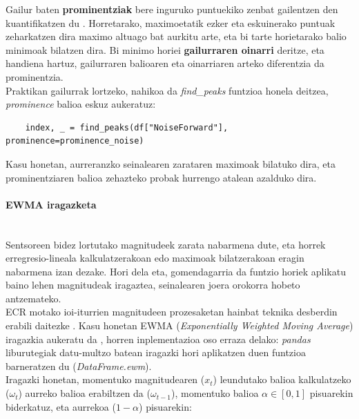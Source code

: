 \documentclass[12pt]{article}
\numberwithin{figure}{section}
\numberwithin{equation}{section}
\begin{document}
Gailur baten \textbf{prominentziak} bere inguruko puntuekiko zenbat gailentzen den kuantifikatzen du \cite{scipy_scipysignal_2025}. Horretarako, maximoetatik ezker eta eskuinerako puntuak zeharkatzen dira maximo altuago bat aurkitu arte, eta bi tarte horietarako balio minimoak bilatzen dira. Bi minimo horiei \textbf{gailurraren oinarri} deritze, eta handiena hartuz, gailurraren balioaren eta oinarriaren arteko diferentzia da prominentzia.\\

Praktikan gailurrak lortzeko, nahikoa da \textit{find\_peaks} funtzioa honela deitzea, \textit{prominence} balioa eskuz aukeratuz:

\begin{verbatim}
    index, _ = find_peaks(df["NoiseForward"], prominence=prominence_noise)
\end{verbatim}

Kasu honetan, aurreranzko seinalearen zarataren maximoak bilatuko dira, eta prominentziaren balioa zehazteko probak hurrengo atalean azalduko dira.

\paragraph{EWMA iragazketa} \leavevmode\\

Sentsoreen bidez lortutako magnitudeek zarata nabarmena dute, eta  horrek erregresio-lineala kalkulatzerakoan edo maximoak bilatzerakoan eragin nabarmena izan dezake. Hori dela eta, gomendagarria da funtzio horiek aplikatu baino lehen magnitudeak iragaztea, seinalearen joera orokorra hobeto antzemateko.\\

ECR motako ioi-iturrien magnitudeen prozesaketan hainbat teknika desberdin erabili daitezke \cite{wang_ion_2024} \cite{rajagopalan_generalized_2003}. Kasu honetan EWMA (\textit{Exponentially Weighted Moving Average}) iragazkia aukeratu da \cite{ross_chapter_2021}, horren inplementazioa oso erraza delako: \textit{pandas} liburutegiak datu-multzo batean iragazki hori aplikatzen duen funtzioa barneratzen du (\textit{DataFrame.ewm}).\\

Iragazki honetan, momentuko magnitudearen ($x_t$) leundutako balioa kalkulatzeko ($\omega_t$) aurreko balioa erabiltzen da ($\omega_{t-1}$), momentuko balioa $\alpha \in [0,1]$ pisuarekin biderkatuz, eta aurrekoa ($1-\alpha$) pisuarekin:\\
\end{document}
